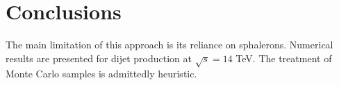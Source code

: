 \section{Conclusions}\label{sec:conclusions}

The main limitation of this approach is its reliance on sphalerons.
Numerical results are presented for dijet production at $\sqrt{s} = 14$
TeV. The treatment of Monte Carlo samples is admittedly heuristic.

